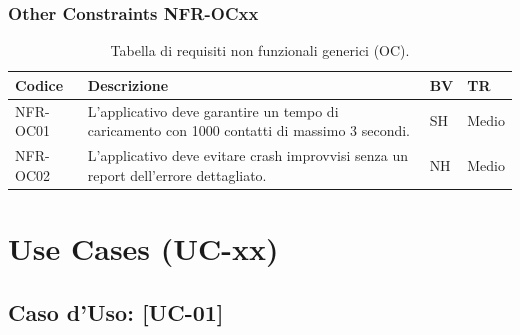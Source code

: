 \documentclass[a4paper,12pt]{article}
\begin{document}
    \subsubsection{Other Constraints NFR-OCxx}
    \begin{table}[H]
        \centering
        \begin{tabular}{|l|p{8cm}|l|l|}
            \hline
            \textbf{Codice} & \textbf{Descrizione} & \textbf{BV} & \textbf{TR} \\
            \hline
            NFR-OC01 & L'applicativo deve garantire un tempo di caricamento con 1000 contatti di massimo 3 secondi. & SH & Medio \\
            \hline
            NFR-OC02 & L'applicativo deve evitare crash improvvisi senza un report dell'errore dettagliato. & NH & Medio \\
            \hline
        \end{tabular}
        \caption{Tabella di requisiti non funzionali generici (OC).}
    \end{table}
    \section{Use Cases (UC-xx)}
    \subsection*{Caso d'Uso: [UC-01]}
\end{document}
